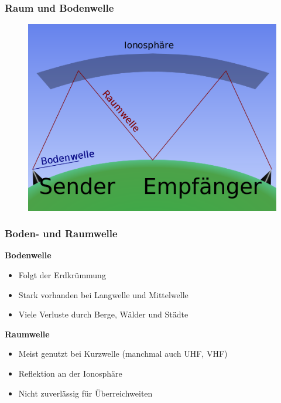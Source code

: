 \begin{frame}
  \frametitle{Raum und Bodenwelle}
  \begin{center}
    \begin{figure}
      \includegraphics[width=1\textwidth,height=.75\textheight,keepaspectratio]{e09/Ionospheric_reflectionpng.png}
    \end{figure}
  \end{center}
\end{frame}

\begin{frame}
  \frametitle{Boden- und Raumwelle}
  \textbf{Bodenwelle}
  \begin{itemize}
    \item Folgt der Erdkrümmung
    \item Stark vorhanden bei Langwelle und Mittelwelle
    \item Viele Verluste durch Berge, Wälder und Städte
  \end{itemize}
  \textbf{Raumwelle}
  \begin{itemize}
    \item Meist genutzt bei Kurzwelle (manchmal auch UHF, VHF)
    \item Reflektion an der Ionosphäre
    \item Nicht zuverlässig für Überreichweiten
  \end{itemize}
\end{frame}

